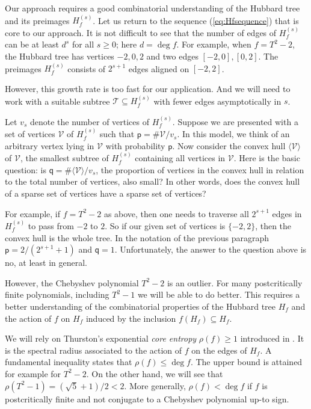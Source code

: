 \documentclass[12pt,oneside,a4]{amsart}
\newcommand{\cV}{\mathcal{V}}
\newcommand{\cT}{\mathcal{T}}
\numberwithin{maincounter}{section}
\numberwithin{equation}{section}
\renewcommand{\subset}{\subseteq}
\begin{document}
Our approach requires a good
combinatorial understanding of the Hubbard tree and its preimages
$H_f^{(s)}$.
Let us return to the sequence (\ref{eq:Hfsequence}) that is core to
our approach.
It is not difficult to see that the number of edges of $H_f^{(s)}$ can
be at least $d^s$ for all $s\ge 0$; here $d=\deg f$. For example, when $f=T^2-2$, the
Hubbard tree has vertices $-2,0,2$ and two edges $[-2,0],[0,2]$. The
preimages  $H_f^{(s)}$ consists of $2^{s+1}$ edges aligned on
$[-2,2]$. 

However, this growth rate is too fast for our application. And we will
need to work with a suitable subtree $\cT\subset H_f^{(s)}$ with fewer
edges asymptotically in $s$.

Let $v_s$ denote the number of vertices of $H_f^{(s)}$. Suppose we are
presented with a set of vertices $\cV$ of $H_f^{(s)}$ such that
$\mathsf{p}=\#\cV/v_s$. In this model, we think
of an arbitrary vertex lying in $\cV$ with  probability
$\mathsf{p}$.  Now consider the convex hull $\langle
\cV\rangle$ of $\cV$, the smallest subtree of $H_f^{(s)}$ containing
all vertices in $\cV$. Here is the basic question: is
$\mathsf{q}=\#\langle \cV\rangle / v_s$, the proportion of vertices in the
convex hull in relation to the total number of vertices, also small? In other
words, does the convex hull of a sparse set of vertices have
a sparse set of vertices?

For example, if $f=T^2-2$ as above, then one needs to traverse all
$2^{s+1}$ edges in $H_f^{(s)}$ to pass from $-2$ to $2$.
So if our given set of vertices is $\{-2,2\}$, then the convex hull is
the whole tree. 
In the notation of the previous paragraph
$\mathsf{p}=2/(2^{s+1}+1)$ and $\mathsf{q}=1$. Unfortunately, the answer to the question above is
no, at least in general.

However, the Chebyshev polynomial $T^2-2$ is an outlier. For many
postcritically finite polynomials, including $T^2-1$ we will be able
to do better. This requires a better understanding of the
combinatorial properties of the Hubbard tree $H_f$ and the action of
$f$ on $H_f$ induced by the inclusion $f(H_f) \subset H_f$.

We will rely on Thurston's exponential \textit{core entropy}
$\rho(f)\ge 1$ introduced in \cite{thurstonetal:degreed}.
It is the spectral radius associated to the action of $f$ on the edges
of $H_f$.  
A fundamental inequality states  that $\rho(f)\le \deg f$. The upper bound is attained for
example for $T^2-2$. On the other hand, we will see that
$\rho(T^2-1) = (\sqrt 5+1)/2<2$.
More generally,  $\rho(f)<\deg f$ if $f$ is postcritically finite and not
conjugate to a Chebyshev polynomial up-to sign.
\end{document}
